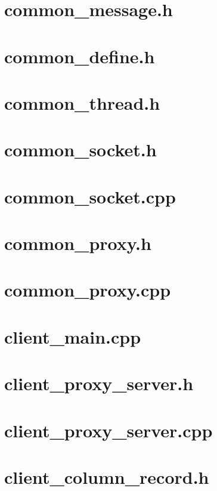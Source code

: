 \documentclass{article}
\begin{document}
\tableofcontents
\newpage
\section{ common\_message.h }

\newpage
\section{ common\_define.h }

\newpage
\section{ common\_thread.h }

\newpage
\section{ common\_socket.h }

\newpage
\section{ common\_socket.cpp }

\newpage
\section{ common\_proxy.h }

\newpage
\section{ common\_proxy.cpp }

\newpage
\section{ client\_main.cpp }

\newpage
\section{ client\_proxy\_server.h }

\newpage
\section{ client\_proxy\_server.cpp }

\newpage
\section{ client\_column\_record.h}

\newpage
\end{document}
